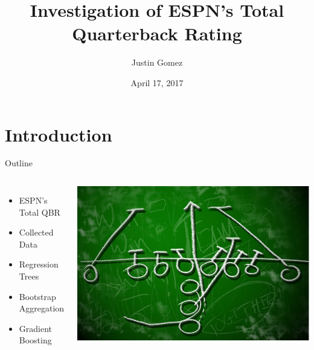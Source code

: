 \documentclass{beamer}
\title[ESPN's Total QBR]{Investigation of ESPN's Total Quarterback Rating}
\author{Justin Gomez}
\institute{Montana State University}
\date{April 17, 2017}
\begin{document}
	
	\begin{frame}
		\titlepage
	\end{frame}
	
	
	\section{Introduction}
	
	\begin{frame}{Outline}
		\begin{columns}
			\begin{itemize}
				\item ESPN's Total QBR
				\item Collected Data
				\item Regression Trees
				\item Bootstrap Aggregation
				\item Gradient Boosting
			\end{itemize}
			\includegraphics[scale=.2]{football-strategy.jpg}
		\end{columns}
	\end{frame}
	
\end{document}
